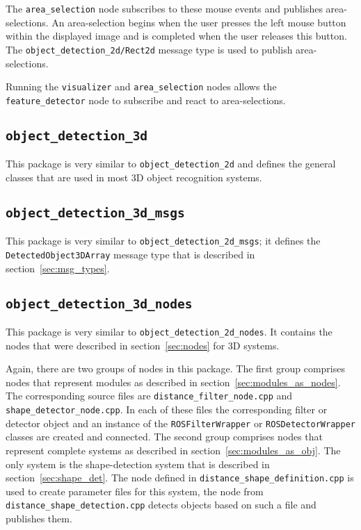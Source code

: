 \documentclass{article}
\newcommand{\code}[1]{\texttt{#1}}
\begin{document}
The \code{area\_selection} node subscribes to these mouse events and publishes
area-selections. An area-selection begins when the user presses the left mouse
button within the displayed image and is completed when the user releases this
button. The \code{object\_detection\_2d/Rect2d} message type is used to
publish area-selections.

Running the \code{visualizer} and \code{area\_selection} nodes allows the
\code{feature\_detector} node to subscribe and react to area-selections.


\subsection{\code{object\_detection\_3d}}
This package is very similar to \code{object\_detection\_2d} and defines the
general classes that are used in most 3D object recognition systems.


\subsection{\code{object\_detection\_3d\_msgs}}
This package is very similar to \code{object\_detection\_2d\_msgs};
it defines the \code{DetectedObject3DArray} message
type that is described in section~\ref{sec:msg_types}.


\subsection{\code{object\_detection\_3d\_nodes}}
This package is very similar to \code{object\_detection\_2d\_nodes}.
It contains the nodes that were described in section~\ref{sec:nodes}
for 3D systems.

Again, there are two groups of nodes in this package.
The first group comprises nodes that represent modules as described in
section~\ref{sec:modules_as_nodes}. The corresponding
source files are \code{distance\_filter\_node.cpp} and
\code{shape\_detector\_node.cpp}.
In each of these files the corresponding filter or detector object and an
instance of the \code{ROSFilterWrapper} or \code{ROSDetectorWrapper} classes are
created and connected.
The second group comprises nodes that represent complete systems as described in
section~\ref{sec:modules_as_obj}.
The only system is the shape-detection system that is described in
section~\ref{sec:shape_det}.
The node defined in \code{distance\_shape\_definition.cpp} is used to create
parameter files for this system, the node from \code{distance\_shape\_detection.cpp}
detects objects based on such a file and publishes them.
\end{document}
